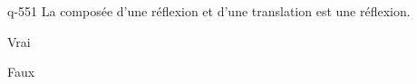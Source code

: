 \begin{truefalse}{q-551}
La composée d'une réflexion et d'une translation est une réflexion.
\item Vrai
\item* Faux
\end{truefalse}

